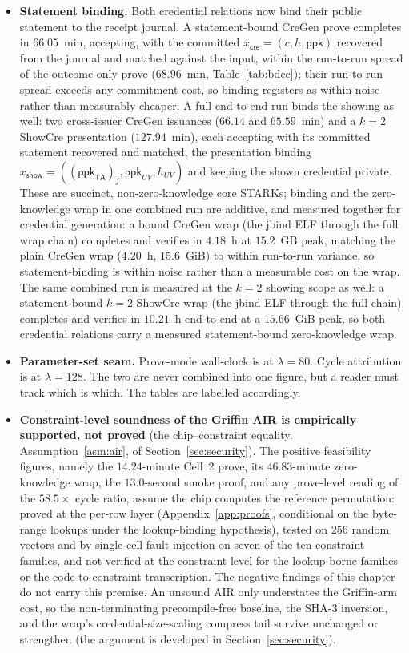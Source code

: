 \begin{itemize}
    \item \textbf{Statement binding.} Both credential relations now bind their public statement to the receipt journal. A statement-bound CreGen prove completes in $66.05$~min, accepting, with the committed $x_{\mathsf{cre}}=(c,h,\mathsf{ppk})$ recovered from the journal and matched against the input, within the run-to-run spread of the outcome-only prove ($68.96$~min, Table~\ref{tab:bdec}); their run-to-run spread exceeds any commitment cost, so binding registers as within-noise rather than measurably cheaper. A full end-to-end run binds the showing as well: two cross-issuer CreGen issuances ($66.14$ and $65.59$~min) and a $k=2$ ShowCre presentation ($127.94$~min), each accepting with its committed statement recovered and matched, the presentation binding $x_{\mathsf{show}}=((\mathsf{ppk}_{\mathsf{TA}})_j,\mathsf{ppk}_{UV},h_{UV})$ and keeping the shown credential private. These are succinct, non-zero-knowledge core STARKs; binding and the zero-knowledge wrap in one combined run are additive, and measured together for credential generation: a bound CreGen wrap (the jbind ELF through the full wrap chain) completes and verifies in $4.18$~h at $15.2$~GB peak, matching the plain CreGen wrap ($4.20$~h, $15.6$~GiB) to within run-to-run variance, so statement-binding is within noise rather than a measurable cost on the wrap. The same combined run is measured at the $k=2$ showing scope as well: a statement-bound $k=2$ ShowCre wrap (the jbind ELF through the full chain) completes and verifies in $10.21$~h end-to-end at a $15.66$~GiB peak, so both credential relations carry a measured statement-bound zero-knowledge wrap.
  \item \textbf{Parameter-set seam.} Prove-mode wall-clock is at $\lambda=80$. Cycle attribution is at $\lambda=128$. The two are never combined into one figure, but a reader must track which is which. The tables are labelled accordingly.
  \item \textbf{Constraint-level soundness of the Griffin AIR is empirically supported, not proved} (the chip--constraint equality, Assumption~\ref{asm:air}, of Section~\ref{sec:security}). The positive feasibility figures, namely the $14.24$-minute Cell~2 prove, its $46.83$-minute zero-knowledge wrap, the $13.0$-second smoke proof, and any prove-level reading of the $58.5\times$ cycle ratio, assume the chip computes the reference permutation: proved at the per-row layer (Appendix~\ref{app:proofs}, conditional on the byte-range lookups under the lookup-binding hypothesis), tested on $256$ random vectors and by single-cell fault injection on seven of the ten constraint families, and not verified at the constraint level for the lookup-borne families or the code-to-constraint transcription. The negative findings of this chapter do not carry this premise. An unsound AIR only understates the Griffin-arm cost, so the non-terminating precompile-free baseline, the SHA-3 inversion, and the wrap's credential-size-scaling compress tail survive unchanged or strengthen (the argument is developed in Section~\ref{sec:security}).

\end{itemize}
